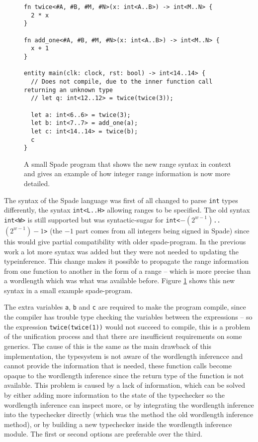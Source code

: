 \begin{figure}[h!]
  \begin{verbatim}
fn twice<#A, #B, #M, #N>(x: int<A..B>) -> int<M..N> {
  2 * x
}

fn add_one<#A, #B, #M, #N>(x: int<A..B>) -> int<M..N> {
  x + 1
}

entity main(clk: clock, rst: bool) -> int<14..14> {
  // Does not compile, due to the inner function call returning an unknown type
  // let q: int<12..12> = twice(twice(3));

  let a: int<6..6> = twice(3);
  let b: int<7..7> = add_one(a);
  let c: int<14..14> = twice(b);
  c
}
  \end{verbatim}
  \caption{A small Spade program that shows the new range syntax in context and gives an example of how integer range information is now more detailed.}
  \label{fig:BetterProgram}
\end{figure}

The syntax of the Spade language was first of all changed to parse \verb+int+ types differently, the syntax \verb+int<L..H>+ allowing ranges to be specified. The old syntax \verb+int<W>+ is still supported but was syntactic-sugar for \verb!int<!$-(2^{w-1})$\verb!..!$(2^{w-1})-1$\verb!>! (the $-1$ part comes from all integers being signed in Spade) since this would give partial compatibility with older spade-program. In the previous work a lot more syntax was added but they were not needed to updating the typeinference. This change makes it possible to propagate the range information from one function to another in the form of a range -- which is more precise than a wordlength which was what was available before. Figure \ref{fig:BetterProgram} shows this new syntax in a small example spade-program.

The extra variables \verb+a+, \verb+b+ and \verb+c+ are required to make the program compile, since the compiler has trouble type checking the variables between the expressions -- so the expression \verb+twice(twice(1))+ would not succeed to compile, this is a problem of the unification process and that there are insufficient requirements on some generics. The cause of this is the same as the main drawback of this implementation, the typesystem is not aware of the wordlength inferencce and cannot provide the information that is needed, these function calls become opaque to the wordlength inference since the return type of the function is not available. This problem is caused by a lack of information, which can be solved by either adding more information to the state of the typechecker so the wordlength inference can inspect more, or by integrating the wordlength inference into the typechecker directly (which was the method the old wordlength inference method), or by building a new typechecker inside the wordlength inference module. The first or second options are preferable over the third.

